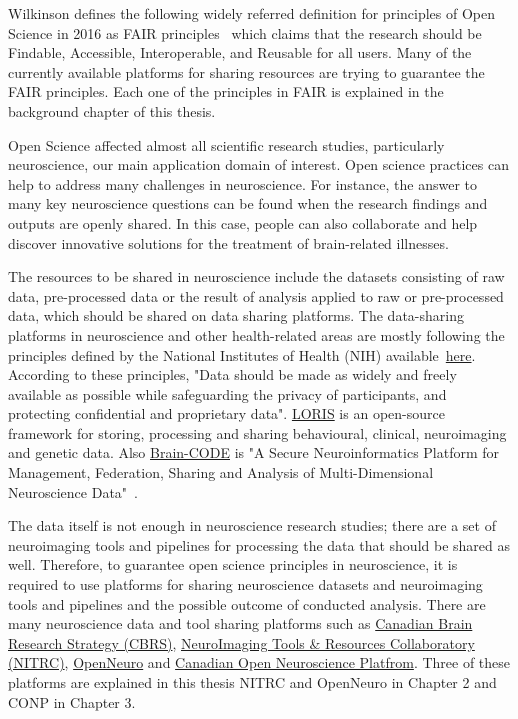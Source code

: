 Wilkinson defines the following widely referred definition for principles of Open Science in 2016 as FAIR principles~\cite{wilkinson2016fair} which claims that the research should be Findable, Accessible, Interoperable, and Reusable for all users. Many of the currently available platforms for sharing resources are trying to guarantee the FAIR principles. Each one of the principles in FAIR is explained in the background chapter of this thesis.  

Open Science affected almost all scientific research studies, particularly neuroscience, our main application domain of interest. Open science practices can help to address many challenges in neuroscience. For instance, the answer to many key neuroscience questions can be found when the research findings and outputs are openly shared. In this case, people can also collaborate and help discover innovative solutions for the treatment of brain-related illnesses. 

The resources to be shared in neuroscience include the datasets consisting of raw data, pre-processed data or the result of analysis applied to raw or pre-processed data, which should be shared on data sharing platforms. The data-sharing platforms in neuroscience and other health-related areas are mostly following the principles defined by the National Institutes of Health (NIH) available~\href{https://grants.nih.gov/grants/policy/data_sharing/data_sharing_guidance.htm}{here}. According to these principles, "Data should be made as widely and freely available as possible while safeguarding the privacy of participants, and protecting confidential and proprietary data". \href{https://loris.ca/index.html}{LORIS} is an open-source framework for storing, processing and sharing behavioural, clinical, neuroimaging and genetic data. Also \href{https://www.braincode.ca/}{Brain-CODE} is "A Secure Neuroinformatics Platform for Management, Federation, Sharing and Analysis of Multi-Dimensional Neuroscience Data"~\cite{vaccarino2018brain}.



The data itself is not enough in neuroscience research studies; there are a set of neuroimaging tools and pipelines for processing the data that should be shared as well. Therefore, to guarantee open science principles in neuroscience, it is required to use platforms for sharing neuroscience datasets and neuroimaging tools and pipelines and the possible outcome of conducted analysis. There are many neuroscience data and tool sharing platforms such as \href{https://canadianbrain.ca/mission-vision/}{Canadian Brain Research Strategy (CBRS)}, \href{https://www.nitrc.org/}{NeuroImaging Tools \& Resources Collaboratory (NITRC)}, \href{https://openneuro.org/}{OpenNeuro} and \href{https://conp.ca/}{Canadian Open Neuroscience Platfrom}. Three of these platforms are explained in this thesis NITRC and OpenNeuro in Chapter 2 and CONP in Chapter 3.



